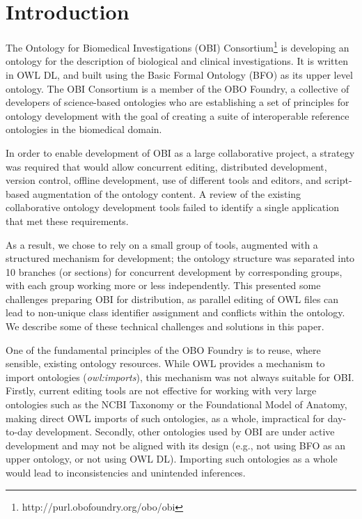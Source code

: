 \documentclass{elsart}       %
\begin{document}
\section{Introduction}
\label{intro}

The Ontology for Biomedical Investigations (OBI) Consortium\footnote{http://purl.obofoundry.org/obo/obi} is developing an ontology for the description of biological and clinical investigations.
It is written in OWL DL, and built using the Basic Formal Ontology%
(BFO)\cite{bfo} as its upper level ontology.
The OBI Consortium is a member of the OBO Foundry\cite{foundry}, a collective of developers of science-based ontologies who are establishing a set of principles for ontology development with the goal of creating a suite of interoperable reference ontologies in the biomedical domain. 


In order to enable development of OBI as a large collaborative project, a strategy was required that would allow concurrent editing, distributed development, version control, offline development, use of different tools and editors, and script-based augmentation of the ontology content.
A review of the existing collaborative ontology development tools failed to identify a single application that met these requirements.

As a result, we chose to rely on a small group of tools, augmented with a structured mechanism for development; the ontology structure was separated into 10 branches (or sections) for concurrent development by corresponding groups, with each group working more or less independently.
This presented some challenges preparing OBI for distribution, as parallel editing of OWL files can lead to non-unique class identifier assignment and conflicts within the ontology. We describe some of these technical challenges and solutions in this paper.

One of the fundamental principles of the OBO Foundry is to reuse, where sensible, existing ontology resources.
While OWL provides a mechanism to import ontologies (\emph{owl:imports}), this mechanism was not always suitable for OBI. Firstly, current editing tools are not effective for working with very large ontologies such as the NCBI Taxonomy\cite{ncbi} or the Foundational Model of Anatomy\cite{fma}, making direct OWL imports of such ontologies, as a whole, impractical for day-to-day development. Secondly, other ontologies used by OBI %
are under active development and may not be aligned with its design (e.g., not using BFO as an upper ontology, or not using OWL DL). Importing such ontologies as a whole would lead to inconsistencies and unintended inferences. 
\end{document}
